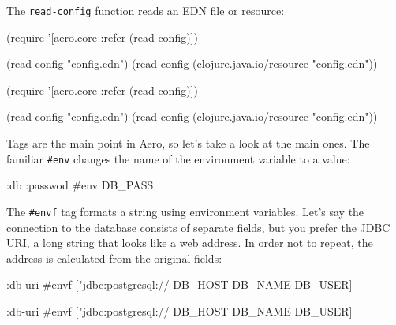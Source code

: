 
The \verb|read-config| function reads an EDN file or resource:

\ifx\DEVICETYPE\MOBILE

\begin{english}
  \begin{clojure}
(require
  '[aero.core :refer (read-config)])

(read-config "config.edn")
(read-config
  (clojure.java.io/resource
    "config.edn"))
  \end{clojure}
\end{english}

\else

\begin{english}
  \begin{clojure}
(require '[aero.core :refer (read-config)])

(read-config "config.edn")
(read-config (clojure.java.io/resource "config.edn"))
  \end{clojure}
\end{english}

\fi


Tags are the main point in Aero, so let's take a look at the main ones. The familiar \verb|#env| changes the name of the environment variable to a value:

\begin{english}
  \begin{clojure}
{:db {:passwod #env DB_PASS}}
  \end{clojure}
\end{english}

The \verb|#envf| tag formats a string using environment variables. Let's say the connection to the database consists of separate fields, but you prefer the JDBC URI, a long string that looks like a web address. In order not to repeat, the address is calculated from the original fields:

\ifx\DEVICETYPE\MOBILE

\begin{english}
  \begin{clojure}
{:db-uri
 #envf ["jdbc:postgresql://%
        DB_HOST DB_NAME DB_USER]}
  \end{clojure}
\end{english}

\else

\begin{english}
  \begin{clojure}
{:db-uri #envf ["jdbc:postgresql://%
                DB_HOST DB_NAME DB_USER]}
  \end{clojure}
\end{english}

